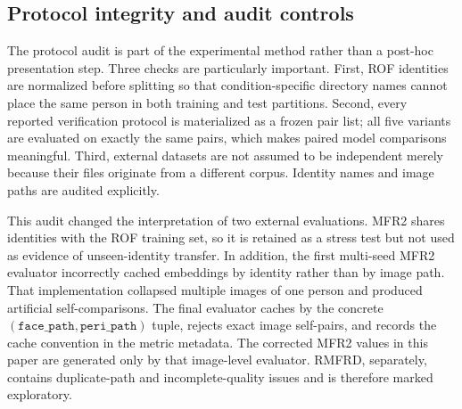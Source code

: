 ﻿\documentclass[10pt,journal,compsoc]{IEEEtran}
\begin{document}
\subsection{Protocol integrity and audit controls}
The protocol audit is part of the experimental method rather than a post-hoc presentation step. Three checks are particularly important. First, ROF identities are normalized before splitting so that condition-specific directory names cannot place the same person in both training and test partitions. Second, every reported verification protocol is materialized as a frozen pair list; all five variants are evaluated on exactly the same pairs, which makes paired model comparisons meaningful. Third, external datasets are not assumed to be independent merely because their files originate from a different corpus. Identity names and image paths are audited explicitly.

This audit changed the interpretation of two external evaluations. MFR2 shares identities with the ROF training set, so it is retained as a stress test but not used as evidence of unseen-identity transfer. In addition, the first multi-seed MFR2 evaluator incorrectly cached embeddings by identity rather than by image path. That implementation collapsed multiple images of one person and produced artificial self-comparisons. The final evaluator caches by the concrete $(\texttt{face\_path},\texttt{peri\_path})$ tuple, rejects exact image self-pairs, and records the cache convention in the metric metadata. The corrected MFR2 values in this paper are generated only by that image-level evaluator. RMFRD, separately, contains duplicate-path and incomplete-quality issues and is therefore marked exploratory.

\begin{table}[t]
\centering
\caption{Evaluation protocols and interpretation after audit.}
\label{tab:protocols}
\end{table}
\end{document}

